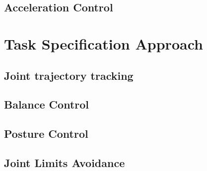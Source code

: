 \subsection{Acceleration Control}

\section{Task Specification Approach}

\subsection{Joint trajectory tracking}
\subsection{Balance Control}
\subsection{Posture Control}
\subsection{Joint Limits Avoidance}
